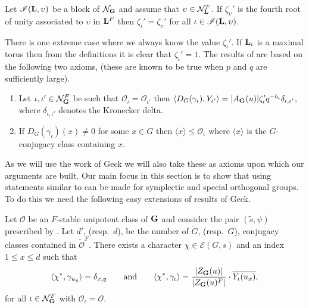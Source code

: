 \documentclass{jt-calcs}
\newcommand{\bl}[1]{\ensuremath{\mathscr{#1}}}
\renewcommand{\cref}{\Cref}
\begin{document}
\begin{lem}
Let $\bl{I}(\bL,\upsilon)$ be a block of $\mathcal{N}_{\mathbf{G}}$ and assume that $\upsilon \in \mathcal{N}_{\mathbf{L}}^F$. If $\zeta_{\upsilon}'$ is the fourth root of unity associated to $\upsilon$ in $\mathbf{L}^F$ then $\zeta_{\iota}' = \zeta_{\upsilon}'$ for all $\iota \in \bl{I}(\bL,\upsilon)$.
\end{lem}

There is one extreme case where we always know the value $\zeta_{\iota}'$. If $\mathbf{L}_{\iota}$ is a maximal torus then from the definitions it is clear that $\zeta_{\iota}' = 1$. The results of \cite{geck:1999:character-sheaves-and-GGGRs} are based on the following two axioms, (these are known to be true when $p$ and $q$ are sufficiently large).
\begin{enumerate}[label=(A\arabic*)]
	\item Let $\iota,\iota' \in \mathcal{N}_{\mathbf{G}}^F$ be such that $\mathcal{O}_{\iota} = \mathcal{O}_{\iota'}$ then $\langle D_G(\gamma_{\iota}), Y_{\iota'}\rangle = |A_{\mathbf{G}}(u)|\zeta_{\iota}'q^{-b_{\iota}}\delta_{\iota,\iota'}$, where $\delta_{\iota,\iota'}$ denotes the Kronecker delta.\label{ax:1}
	\item If $D_G(\gamma_{\iota})(x) \neq 0$ for some $x \in G$ then $\langle x\rangle \leqslant \mathcal{O}_{\iota}$ where $\langle x \rangle$ is the $G$-conjugacy class containing $x$.\label{ax:2}
\end{enumerate}
As we will use the work of Geck we will also take these as axioms upon which our arguments are built. Our main focus in this section is to show that using \cref{thm:A} statements similar to \cite[Theorem 3.8]{geck:1999:character-sheaves-and-GGGRs} can be made for symplectic and special orthogonal groups. To do this we need the following easy extensions of results of Geck.
\begin{prop}\label{prop:GGGR-mult}
Let $\mathcal{O}$ be an $F$-stable unipotent class of $\mathbf{G}$ and consider the pair $(\tilde{s},\psi)$ prescribed by \cref{prop:A}. Let $d'$, (resp.\ $d$), be the number of $\tilde{G}$, (resp.\ $G$), conjugacy classes contained in $\tilde{\mathcal{O}}^F$. There exists a character $\chi \in \mathcal{E}(G,s)$ and an index $1 \leqslant x \leqslant d$ such that
\begin{equation*}
\langle \chi^*, \gamma_{u_y} \rangle = \delta_{x,y}\qquad\text{and}\qquad \langle \chi^*, \gamma_{\iota} \rangle = \frac{|Z_{\mathbf{G}}(u)|}{|Z_{\mathbf{G}}(u)^F|}\cdot\overline{Y_{\iota}(u_x)},
\end{equation*}
for all $\iota \in \mathcal{N}_{\mathbf{G}}^F$ with $\mathcal{O}_\iota = \mathcal{O}$.
\end{prop}
\end{document}
